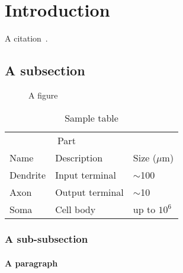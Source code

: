\section{Introduction}
\label{sec:introduction}

A citation~\cite{Hasselmo5249}.
\lipsum[1-3]

\subsection{A subsection}
\label{sec:asubsection}

\lipsum[1-2]

\begin{figure}
    \centering
    
    \caption{A figure}
    \label{fig:figure}
\end{figure}

\lipsum[3-4]

\begin{table}
  \caption{Sample table}
  \label{sample-table}
  \centering
  \begin{tabular}{lll}
    \toprule
    \multicolumn{2}{c}{Part}                   \\
    \cmidrule(r){1-2}
    Name     & Description     & Size ($\mu$m) \\
    \midrule
    Dendrite & Input terminal  & $\sim$100     \\
    Axon     & Output terminal & $\sim$10      \\
    Soma     & Cell body       & up to $10^6$  \\
    \bottomrule
  \end{tabular}
\end{table}

\subsubsection{A sub-subsection}

\lipsum[5]

\paragraph{A paragraph} \lipsum[6]
